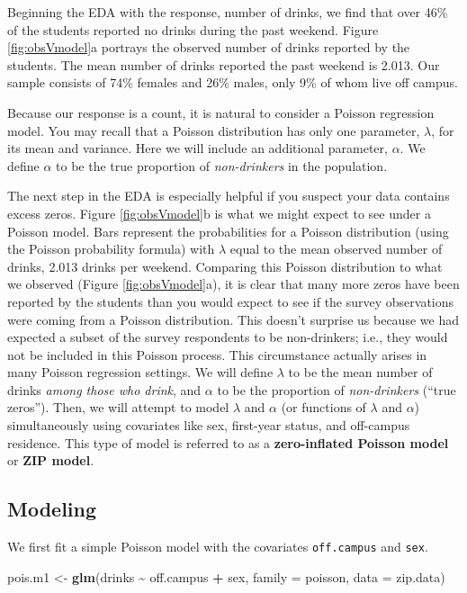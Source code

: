 \documentclass[
]{krantz}
\newenvironment{Shaded}{\begin{snugshade}}{\end{snugshade}}
\newcommand{\AttributeTok}[1]{\textcolor[rgb]{0.27,0.27,0.27}{#1}}
\newcommand{\FunctionTok}[1]{\textcolor[rgb]{0.27,0.27,0.27}{\textbf{#1}}}
\newcommand{\NormalTok}[1]{#1}
\newcommand{\OtherTok}[1]{\textcolor[rgb]{0.37,0.37,0.37}{#1}}
\newcommand{\SpecialCharTok}[1]{\textcolor[rgb]{0.43,0.43,0.43}{\textbf{#1}}}
\begin{document}
Beginning the EDA with the response, number of drinks, we find that over 46\% of the students reported no drinks during the past weekend. Figure \ref{fig:obsVmodel}a portrays the observed number of drinks reported by the students. The mean number of drinks reported the past weekend is 2.013. Our sample consists of 74\% females and 26\% males, only 9\% of whom live off campus.

Because our response is a count, it is natural to consider a Poisson regression model. You may recall that a Poisson distribution has only one parameter, \(\lambda\), for its mean and variance. Here we will include an additional parameter, \(\alpha\). We define \(\alpha\) to be the true proportion of \emph{non-drinkers} in the population.

The next step in the EDA is especially helpful if you suspect your data contains excess zeros. Figure \ref{fig:obsVmodel}b is what we might expect to see under a Poisson model. Bars represent the probabilities for a Poisson distribution (using the Poisson probability formula) with \(\lambda\) equal to the mean observed number of drinks, 2.013 drinks per weekend. Comparing this Poisson distribution to what we observed (Figure \ref{fig:obsVmodel}a), it is clear that many more zeros have been reported by the students than you would expect to see if the survey observations were coming from a Poisson distribution. This doesn't surprise us because we had expected a subset of the survey respondents to be non-drinkers; i.e., they would not be included in this Poisson process. This circumstance actually arises in many Poisson regression settings. We will define \(\lambda\) to be the mean number of drinks \emph{among those who drink}, and \(\alpha\) to be the proportion of \emph{non-drinkers} (``true zeros''). Then, we will attempt to model \(\lambda\) and \(\alpha\) (or functions of \(\lambda\) and \(\alpha\)) simultaneously using covariates like sex, first-year status, and off-campus residence. This type of model is referred to as a \textbf{zero-inflated Poisson model} or \textbf{ZIP model}. 

\subsection{Modeling}\label{modeling}

We first fit a simple Poisson model with the covariates \texttt{off.campus} and \texttt{sex}.

\begin{Shaded}
\begin{Highlighting}[]
\NormalTok{pois.m1 }\OtherTok{\textless{}{-}} \FunctionTok{glm}\NormalTok{(drinks }\SpecialCharTok{\textasciitilde{}}\NormalTok{ off.campus }\SpecialCharTok{+}\NormalTok{ sex, }\AttributeTok{family =}\NormalTok{ poisson,}
               \AttributeTok{data =}\NormalTok{ zip.data)}
\end{Highlighting}
\end{Shaded}
\end{document}
